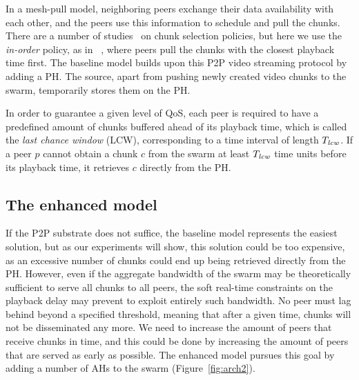 In a mesh-pull model, neighboring peers exchange their data availability
with each other, and the peers use this information to schedule and pull the
chunks. There are a number of studies~\cite{carlsson,chunkselection}
on chunk selection policies, but here we use the {\em in-order} policy, as in
\cool~\cite{coolstreaming}, where peers pull the chunks with the
closest playback time first. The baseline model builds upon this P2P video streaming protocol by adding a
PH. The source, apart from pushing newly created
video chunks to the swarm, temporarily stores them on the PH. 

In order to guarantee a
given level of QoS, each peer is required to have a predefined amount of
chunks buffered ahead of its playback time, which is called the \emph{last
chance window} (LCW), corresponding to a time interval of length $T_{\mathit{lcw}}$.
If a peer $p$ cannot obtain a chunk $c$ from the swarm at least $T_{\mathit{lcw}}$ time units before its playback time,
it retrieves $c$ directly from the PH.

\subsection{The enhanced model}

If the P2P substrate does not suffice, the baseline model represents the
easiest solution, but as our experiments will show, this solution could be too
expensive, as an excessive number of chunks could end up being retrieved
directly from the PH. However, even if the aggregate bandwidth of the swarm
may be theoretically sufficient to serve all chunks to all peers, the soft
real-time constraints on the playback delay may prevent to exploit entirely
such bandwidth. No peer must lag behind beyond a specified threshold, meaning
that after a given time, chunks will not be disseminated any more. We need to
increase the amount of peers that receive chunks in time, and this could be
done by increasing the amount of peers that are served as early as possible.
The enhanced model pursues this goal by adding a number of AHs to the swarm
(Figure~\ref{fig:arch2}).

